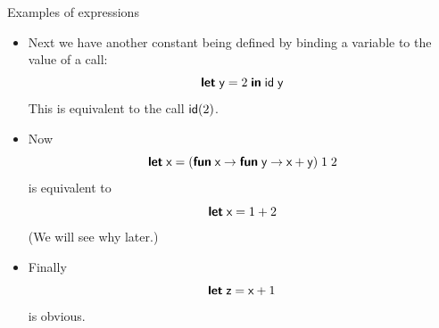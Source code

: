 %
\begin{frame}[fragile]{Examples of expressions}

  \begin{itemize}

    \item Next we have another constant being defined by binding a
      variable to the value of a call:
      {\setlength{\abovedisplayskip}{2pt}
       \setlength{\belowdisplayskip}{2pt}
      \begin{equation*}
        \textsf{\textbf{let}}\; \textsf{y} = 2 \; \textsf{\textbf{in}}\; \textsf{id} \; \textsf{y}
      \end{equation*}}
      This is equivalent to the call $\textsf{id}(2)$.

    \item Now
      {\setlength{\abovedisplayskip}{2pt}
       \setlength{\belowdisplayskip}{2pt}
      \begin{equation*}
        \textsf{\textbf{let}}\; \textsf{x} = (\textsf{\textbf{fun}}\; \textsf{x} \rightarrow \textsf{\textbf{fun}}\; \textsf{y} \rightarrow \textsf{x} + \textsf{y}) \; 1 \; 2
      \end{equation*}}
      is equivalent to
      {\setlength{\belowdisplayskip}{2pt}
      \begin{equation*}
        \textsf{\textbf{let}}\; \textsf{x} = 1 + 2
      \end{equation*}}
      (We will see why later.)

    \item Finally
      {\setlength{\abovedisplayskip}{2pt}
       \setlength{\belowdisplayskip}{2pt}
      \begin{equation*}
        \textsf{\textbf{let}}\; \textsf{z} = \textsf{x} + 1
      \end{equation*}}
      is obvious.

  \end{itemize}

\end{frame}

